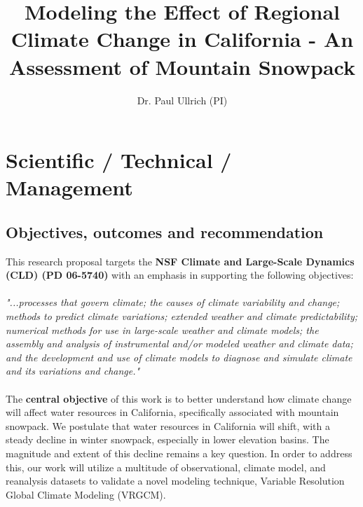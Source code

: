 \documentclass[11pt]{article}
\title{\textbf{Modeling the Effect of Regional Climate Change in California - An Assessment of Mountain Snowpack}}
\author{Dr. Paul Ullrich (PI)}
\date{ }
\begin{document}
\maketitle
 
\tableofcontents

\section{Scientific / Technical / Management}
\subsection{Objectives, outcomes and recommendation}
This research proposal targets the \textbf{NSF Climate and Large-Scale Dynamics (CLD) (PD 06-5740)} with an emphasis in supporting the following objectives:
\\\\
\textit{"...processes that govern climate; the causes of climate variability and change; methods to predict climate variations; extended weather and climate predictability; numerical methods for use in large-scale weather and climate models; the assembly and analysis of instrumental and/or modeled weather and climate data; and the development and use of climate models to diagnose and simulate climate and its variations and change."}
\\\\
The \textbf{central objective} of this work is to better understand how climate change will affect water resources in California, specifically associated with mountain snowpack.  We postulate that water resources in California will shift, with a steady decline in winter snowpack, especially in lower elevation basins.  The magnitude and extent of this decline remains a key question.  In order to address this, our work will utilize a multitude of observational, climate model, and reanalysis datasets to validate a novel modeling technique, Variable Resolution Global Climate Modeling (VRGCM).
\end{document}
